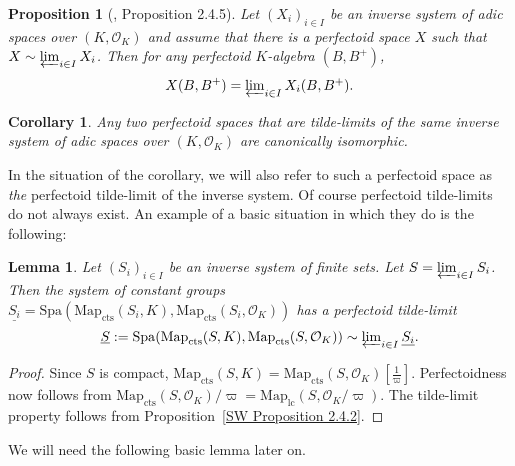 \documentclass[10pt,oneside]{amsart}
\newtheorem{lemma}[theorem]{Lemma}
\newtheorem{proposition}[theorem]{Proposition}
\newtheorem{corollary}[theorem]{Corollary}
\theoremstyle{definition}
\renewcommand{\O}{\mathcal{O}}
\begin{document}
\begin{proposition}[\cite{SW}, Proposition 2.4.5]\label{SW Proposition 2.4.5}
	Let $(X_i)_{i\in I}$ be an inverse system of adic spaces over $(K,\mathcal O_K)$ and assume that there is a perfectoid space $X$ such that $X\sim \varprojlim_{i\in I} X_i$. Then for any perfectoid $K$-algebra $(B,B^{+})$, 
	\[X(B,B^{+})  = \textstyle\varprojlim_{i\in I}X_i(B,B^{+}).\]
\end{proposition}
\begin{corollary}\label{corollary: perfectoid tilde limit is unique}
	Any two perfectoid spaces that are tilde-limits of the same inverse system of adic spaces over $(K,\mathcal O_K)$ are canonically isomorphic.
\end{corollary}
In the situation of the corollary, we will also refer to such a perfectoid space as \textit{the} perfectoid tilde-limit of the inverse system. Of course perfectoid tilde-limits do not always exist. An example of a basic situation in which they do is the following:
\begin{lemma}\label{l:pro-finite-perfectoid-spaces}
	Let $(S_i)_{i\in I}$ be an inverse system of finite sets. Let $S=\varprojlim_{i\in I} S_i$. Then the system of constant groups $\underline{S_i}=\mathrm{Spa}(\mathrm{Map}_{\mathrm{cts}}(S_i,K),\mathrm{Map}_{\mathrm{cts}}(S_i,\O_K))$ has a perfectoid tilde-limit	\[\underline{S}:=\mathrm{Spa}(\mathrm{Map}_{\mathrm{cts}}(S,K),\mathrm{Map}_{\mathrm{cts}}(S,\O_K))\sim\textstyle\varprojlim_{i\in I} \underline{S_i}.\]
\end{lemma}
\begin{proof}
	Since $S$ is compact, $\mathrm{Map}_{\mathrm{cts}}(S,K)=\mathrm{Map}_{\mathrm{cts}}(S,\O_K)[\tfrac{1}{\varpi}]$. Perfectoidness now follows from $\mathrm{Map}_{\mathrm{cts}}(S,\O_K)/\varpi=\mathrm{Map}_{\mathrm{lc}}(S,\O_K/\varpi)$. The tilde-limit property follows from Proposition~\ref{SW Proposition 2.4.2}.
\end{proof}
We will need the following basic lemma later on.
\end{document}
